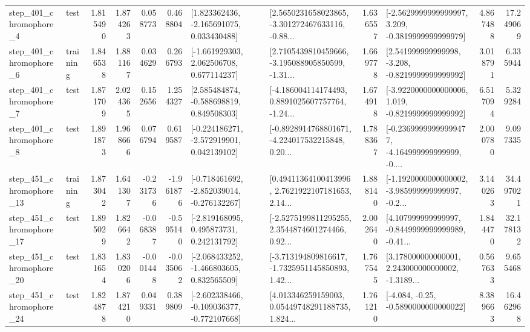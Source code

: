 \begin{tabular}{llrrrrllrlrr}
   step\_401\_chromophore\_4 &      test &      1.815490 &    1.874263 &      0.058773 &  0.468804 &    [1.823362436, -2.165691075, 0.033430488] &  [2.5650231658023865, -3.301272467633116, -0.88... &       1.636557 &  [-2.5629999999999997, 3.209, -0.3819999999999979] &            4.867488 &         17.249069 \\
   step\_401\_chromophore\_6 &  training &      1.846538 &    1.881167 &      0.034629 &  0.266793 &    [-1.661929303, 2.062506708, 0.677114237] &  [2.7105439810459666, -3.195088905850599, -1.31... &       1.669778 &   [2.541999999999998, -3.208, -0.8219999999999992] &            3.018791 &          6.335944 \\
   step\_401\_chromophore\_7 &      test &      1.871709 &    2.024365 &      0.152656 &  1.254327 &    [2.585484874, -0.588698819, 0.849508303] &  [-4.186004114174493, 0.8891025607757764, -1.24... &       1.674918 &  [-3.9220000000000006, 1.019, -0.8219999999999992] &            6.517094 &          5.329284 \\
   step\_401\_chromophore\_8 &      test &      1.891873 &    1.968666 &      0.076794 &  0.619587 &   [-0.224186271, -2.572919901, 0.042139102] &  [-0.8928914768801671, -4.224017532215848, 0.20... &       1.788367 &  [-0.23699999999999477, -4.164999999999999, -0.... &            2.000780 &          9.097335 \\
  step\_451\_chromophore\_13 &  training &      1.873042 &    1.641307 &     -0.231736 & -1.961876 &  [-0.718461692, -2.852039014, -0.276132267] &  [0.49411364100413996, 2.7621922107181653, 2.14... &       1.888140 &  [-1.1920000000000002, -3.985999999999997, -0.2... &            3.140263 &         34.497021 \\
  step\_451\_chromophore\_17 &      test &      1.895029 &    1.826642 &     -0.068387 & -0.595140 &    [-2.819168095, 0.495873731, 0.242131792] &  [-2.5275199811295255, 2.3544874601274466, 0.92... &       2.002640 &  [4.107999999999997, -0.8449999999999989, -0.41... &            1.844470 &         32.178132 \\
  step\_451\_chromophore\_20 &      test &      1.831654 &    1.830206 &     -0.001448 & -0.035062 &   [-2.068433252, -1.466803605, 0.832565509] &  [-3.713194809816617, -1.7325951145850893, 1.42... &       1.767545 &  [3.178000000000001, 2.243000000000002, -1.3189... &            0.567633 &          9.655468 \\
  step\_451\_chromophore\_24 &      test &      1.824878 &    1.874210 &      0.049331 &  0.389809 &  [-2.602338466, -0.109036377, -0.772107668] &  [4.013346259159003, 0.05449748291188735, 1.824... &       1.761210 &               [-4.084, -0.25, -0.5890000000000022] &            8.389663 &         16.462968 \\

\end{tabular}
